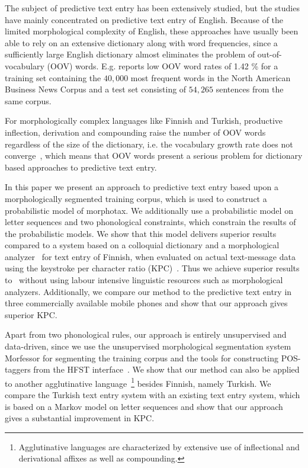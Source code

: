 \documentclass{llncs}
\begin{document}
The subject of predictive text entry has been extensively studied, but
the studies have mainly concentrated on predictive text entry of
English. Because of the limited morphological complexity of English,
these approaches have usually been able to rely on an extensive
dictionary along with word frequencies, since a sufficiently large
English dictionary almost eliminates the problem of out-of-vocabulary
(OOV) words. E.g. \cite{klarlund/2002} reports low OOV word rates of
1.42 \% for a training set containing the $40,000$ most frequent words
in the North American Business News Corpus and a test set consisting
of $54,265$ sentences from the same corpus.

For morphologically complex languages like Finnish and Turkish,
productive inflection, derivation and compounding raise the number of
OOV words regardless of the size of the dictionary, i.e. the
vocabulary growth rate does not
converge~\cite{Creutz_morph-basedspeech}, which means that OOV words
present a serious problem for dictionary based approaches to
predictive text entry.

In this paper we present an approach to predictive text entry based
upon a morphologically segmented training corpus, which is used to
construct a probabilistic model of morphotax. We additionally use a
probabilistic model on letter sequences and two phonological
constraints, which constrain the results of the probabilistic models. We
show that this model delivers superior results compared to a system
based on a colloquial dictionary and a morphological
analyzer~\cite{silfverberg/2011/cla} for text entry of Finnish, when
evaluated on actual text-message data using the keystroke per
character ratio (KPC)~\cite{MacKenzie02kspc}. Thus we achieve superior
results to~\cite{silfverberg/2011/cla} without using labour intensive
linguistic resources such as morphological analyzers. Additionally, we
compare our method to the predictive text entry in three commercially
available mobile phones and show that our approach gives superior KPC.

Apart from two phonological rules, our approach is entirely
unsupervised and data-driven, since we use the unsupervised
morphological segmentation system Morfessor \cite{Creutz07ACMTSLP} for
segmenting the training corpus and the tools for constructing
POS-taggers from the HFST interface~\cite{hfst/2011}. We show that our
method can also be applied to another agglutinative
language~\footnote{Agglutinative languages are characterized by
  extensive use of inflectional and derivational affixes as well as
  compounding.} besides Finnish, namely Turkish. We compare the Turkish
text entry system with an existing text entry system, which is based
on a Markov model on letter sequences and show that our approach gives
a substantial improvement in KPC.
\end{document}
